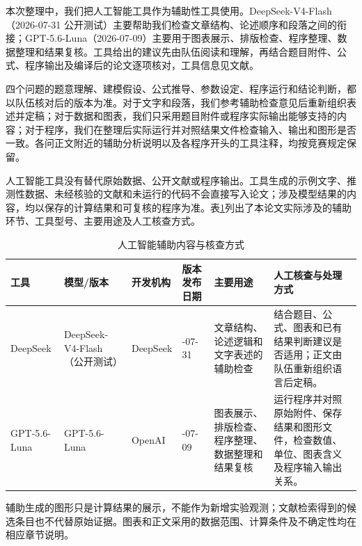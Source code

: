 本次整理中，我们把人工智能工具作为辅助性工具使用。DeepSeek-V4-Flash（2026-07-31 公开测试）主要帮助我们检查文章结构、论述顺序和段落之间的衔接；GPT-5.6-Luna（2026-07-09）主要用于图表展示、排版检查、程序整理、数据整理和结果复核。工具给出的建议先由队伍阅读和理解，再结合题目附件、公式、程序输出及编译后的论文逐项核对，工具信息见文献\cite{ai_deepseek,ai_gpt56luna}。

四个问题的题意理解、建模假设、公式推导、参数设定、程序运行和结论判断，都以队伍核对后的版本为准。对于文字和段落，我们参考辅助检查意见后重新组织表述并定稿；对于数据和图表，我们只采用题目附件或程序实际输出能够支持的内容；对于程序，我们在整理后实际运行并对照结果文件检查输入、输出和图形是否一致。各问正文附近的辅助分析说明以及各程序开头的工具注释，均按竞赛规定保留\cite{ai_rules2026}。

人工智能工具没有替代原始数据、公开文献或程序输出。工具生成的示例文字、推测性数据、未经核验的文献和未运行的代码不会直接写入论文；涉及模型结果的内容，均以保存的计算结果和可复核的程序为准。表\ref{tab:ai_use}列出了本论文实际涉及的辅助环节、工具型号、主要用途及人工核查方式。

\begin{table}[H]
\centering
\caption{人工智能辅助内容与核查方式}\label{tab:ai_use}
\begingroup\normalsize\renewcommand{\arraystretch}{1.15}
\setlength{\tabcolsep}{4pt}
\begin{tabularx}{\textwidth}{@{}
>{\raggedright\arraybackslash}p{}
>{\raggedright\arraybackslash}p{}
>{\raggedright\arraybackslash}p{}
>{\raggedright\arraybackslash}p{}
>{\raggedright\arraybackslash}X
>{\raggedright\arraybackslash}X@{}}
\toprule
工具 & 模型/版本 & 开发机构 & 版本发布日期 & 主要用途 & 人工核查与处理方式\\
\midrule
DeepSeek & DeepSeek-V4-Flash（公开测试） & DeepSeek & 2026-07-31 & 文章结构、论述逻辑和文字表述的辅助检查 & 结合题目、公式、图表和已有结果判断建议是否适用；正文由队伍重新组织语言后定稿。\\
GPT-5.6-Luna & GPT-5.6-Luna & OpenAI & 2026-07-09 & 图表展示、排版检查、程序整理、数据整理和结果复核 & 运行程序并对照原始附件、保存结果和图形文件，检查数值、单位、图表含义及程序输入输出关系。\\
\bottomrule
\end{tabularx}
\endgroup
\end{table}

辅助生成的图形只是计算结果的展示，不能作为新增实验观测；文献检索得到的候选条目也不代替原始证据。图表和正文采用的数据范围、计算条件及不确定性均在相应章节说明。


